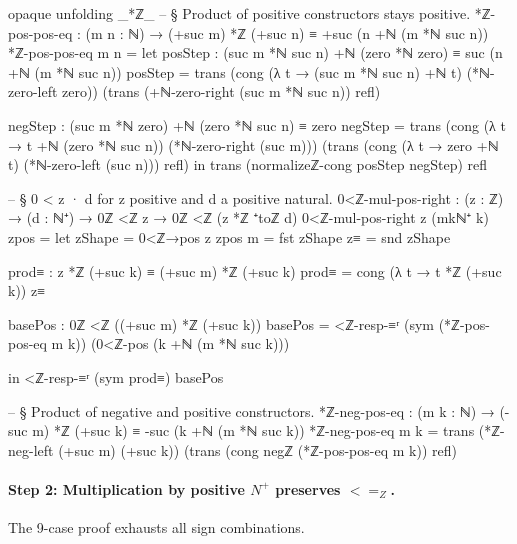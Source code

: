 \documentclass[11pt,a4paper]{book}
\def\leq{<=}%
\def\mathbb#1{#1}%
\begin{document}
\begin{code}
opaque
  unfolding _*ℤ_
  -- § Product of positive constructors stays positive.
  *ℤ-pos-pos-eq : (m n : ℕ) → (+suc m) *ℤ (+suc n) ≡ +suc (n +ℕ (m *ℕ suc n))
  *ℤ-pos-pos-eq m n =
    let posStep : (suc m *ℕ suc n) +ℕ (zero *ℕ zero) ≡ suc (n +ℕ (m *ℕ suc n))
        posStep =
          trans
            (cong (λ t → (suc m *ℕ suc n) +ℕ t) (*ℕ-zero-left zero))
            (trans
              (+ℕ-zero-right (suc m *ℕ suc n))
              refl)

        negStep : (suc m *ℕ zero) +ℕ (zero *ℕ suc n) ≡ zero
        negStep =
          trans
            (cong (λ t → t +ℕ (zero *ℕ suc n)) (*ℕ-zero-right (suc m)))
            (trans
              (cong (λ t → zero +ℕ t) (*ℕ-zero-left (suc n)))
              refl)
    in
    trans
      (normalizeℤ-cong posStep negStep)
      refl

-- § 0 < z · d for z positive and d a positive natural.
0<ℤ-mul-pos-right : (z : ℤ) → (d : ℕ⁺) → 0ℤ <ℤ z → 0ℤ <ℤ (z *ℤ ⁺toℤ d)
0<ℤ-mul-pos-right z (mkℕ⁺ k) zpos =
  let zShape = 0<ℤ→pos z zpos
      m = fst zShape
      z≡ = snd zShape

      prod≡ : z *ℤ (+suc k) ≡ (+suc m) *ℤ (+suc k)
      prod≡ = cong (λ t → t *ℤ (+suc k)) z≡

      basePos : 0ℤ <ℤ ((+suc m) *ℤ (+suc k))
      basePos =
        <ℤ-resp-≡ʳ (sym (*ℤ-pos-pos-eq m k)) (0<ℤ-pos (k +ℕ (m *ℕ suc k)))

  in
  <ℤ-resp-≡ʳ (sym prod≡) basePos

-- § Product of negative and positive constructors.
*ℤ-neg-pos-eq : (m k : ℕ) → (-suc m) *ℤ (+suc k) ≡ -suc (k +ℕ (m *ℕ suc k))
*ℤ-neg-pos-eq m k =
  trans
    (*ℤ-neg-left (+suc m) (+suc k))
    (trans
      (cong negℤ (*ℤ-pos-pos-eq m k))
      refl)
\end{code}

\paragraph{Step 2: Multiplication by positive $\mathbb{N}^+$ preserves $\leq_{\mathbb{Z}}$.}
The 9-case proof exhausts all sign combinations.
\end{document}
